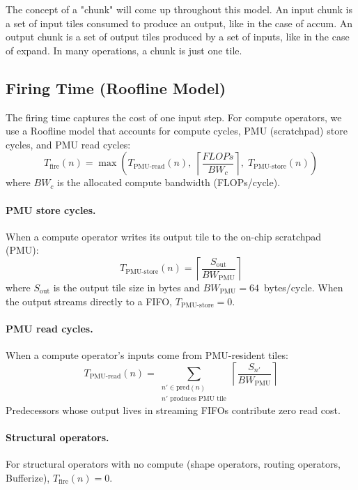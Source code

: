 \documentclass[10pt]{article}
\begin{document}
The concept of a "chunk" will come up throughout this model. An input chunk is a set of input tiles consumed to produce an output, like in the case of accum. An output chunk is a set of output tiles produced by a set of inputs, like in the case of expand. In many operations, a chunk is just one tile.
\subsection{Firing Time (Roofline Model)}

The firing time captures the cost of one input step. For compute operators, we use a Roofline model that accounts for compute cycles, PMU (scratchpad) store cycles, and PMU read cycles:
\begin{equation}
    T_{\text{fire}}(n) = \max\!\left(
        T_{\text{PMU-read}}(n),\;
        \left\lceil\frac{\mathit{FLOPs}}{\mathit{BW}_c}\right\rceil,\;
        T_{\text{PMU-store}}(n)
    \right)
    \label{eq:tfire}
\end{equation}
where $\mathit{BW}_c$ is the allocated compute bandwidth (FLOPs/cycle).

\paragraph{PMU store cycles.} When a compute operator writes its output tile to the on-chip scratchpad (PMU):
\begin{equation}
    T_{\text{PMU-store}}(n) = \left\lceil\frac{S_{\text{out}}}{\mathit{BW}_{\text{PMU}}}\right\rceil
\end{equation}
where $S_{\text{out}}$ is the output tile size in bytes and $\mathit{BW}_{\text{PMU}} = 64$~bytes/cycle. When the output streams directly to a FIFO, $T_{\text{PMU-store}} = 0$.

\paragraph{PMU read cycles.} When a compute operator's inputs come from PMU-resident tiles:
\begin{equation}
    T_{\text{PMU-read}}(n) = \sum_{\substack{n' \in \text{pred}(n) \\ n' \text{ produces PMU tile}}} \left\lceil\frac{S_{n'}}{\mathit{BW}_{\text{PMU}}}\right\rceil
\end{equation}
Predecessors whose output lives in streaming FIFOs contribute zero read cost.

\paragraph{Structural operators.} For structural operators with no compute (shape operators, routing operators, Bufferize), $T_{\text{fire}}(n) = 0$.
\end{document}
